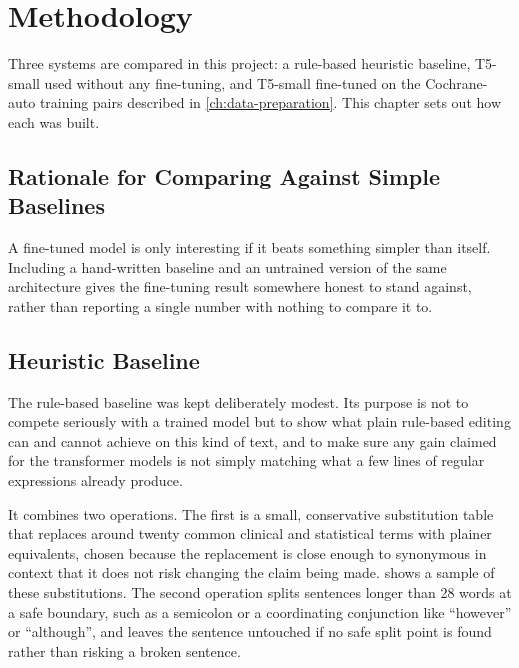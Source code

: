 \chapter{Methodology}
\label{ch:methodology}

Three systems are compared in this project: a rule-based heuristic baseline, T5-small used without any fine-tuning, and T5-small fine-tuned on the Cochrane-auto training pairs described in \cref{ch:data-preparation}. This chapter sets out how each was built.

\section{Rationale for Comparing Against Simple Baselines}
\label{sec:baseline-rationale}

A fine-tuned model is only interesting if it beats something simpler than itself. Including a hand-written baseline and an untrained version of the same architecture gives the fine-tuning result somewhere honest to stand against, rather than reporting a single number with nothing to compare it to.

\section{Heuristic Baseline}
\label{sec:heuristic-baseline}

The rule-based baseline was kept deliberately modest. Its purpose is not to compete seriously with a trained model but to show what plain rule-based editing can and cannot achieve on this kind of text, and to make sure any gain claimed for the transformer models is not simply matching what a few lines of regular expressions already produce.

It combines two operations. The first is a small, conservative substitution table that replaces around twenty common clinical and statistical terms with plainer equivalents, chosen because the replacement is close enough to synonymous in context that it does not risk changing the claim being made.  shows a sample of these substitutions. The second operation splits sentences longer than 28 words at a safe boundary, such as a semicolon or a coordinating conjunction like ``however'' or ``although'', and leaves the sentence untouched if no safe split point is found rather than risking a broken sentence.


